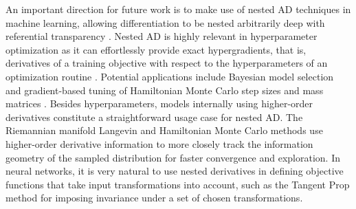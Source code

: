 \documentclass[twoside,11pt]{article}
\begin{document}
An important direction for future work is to make use of nested AD techniques in machine learning, allowing differentiation to be nested arbitrarily deep with referential transparency \citep{Siskind2008b,pearlmutter2008reverse}. Nested AD is highly relevant in hyperparameter optimization as it can effortlessly provide exact hypergradients, that is, derivatives of a training objective with respect to the hyperparameters of an optimization routine \citep{Maclaurin2015,baydin2017online}. Potential applications include Bayesian model selection \citep{Rasmussen2006} and gradient-based tuning of Hamiltonian Monte Carlo step sizes and mass matrices \citep{Salimans2014}. Besides hyperparameters, models internally using higher-order derivatives constitute a straightforward usage case for nested AD. The Riemannian manifold Langevin and Hamiltonian Monte Carlo methods \citep{Girolami2011} use higher-order derivative information to more closely track the information geometry of the sampled distribution for faster convergence and exploration. In neural networks, it is very natural to use nested derivatives in defining objective functions that take input transformations into account, such as the Tangent Prop method \citep{Simard1998} for imposing invariance under a set of chosen transformations.



%
%



\vskip 0.2in

\end{document}
